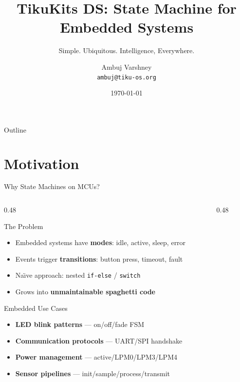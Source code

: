 \documentclass[aspectratio=169, 10pt]{beamer}
\title[TikuKits DS]{TikuKits DS: State Machine for Embedded Systems}
\subtitle{Simple. Ubiquitous. Intelligence, Everywhere.}
\author[Ambuj Varshney]{Ambuj Varshney \\ \texttt{ambuj@tiku-os.org}}
\date{\today}
\begin{document}
\begin{frame}
\titlepage
\end{frame}

\begin{frame}{Outline}
\tableofcontents
\end{frame}

\section{Motivation}

\begin{frame}{Why State Machines on MCUs?}
\begin{columns}[T]
\begin{column}{0.48\textwidth}
\begin{block}{The Problem}
\begin{itemize}
  \item Embedded systems have \textbf{modes}: idle, active, sleep, error
  \item Events trigger \textbf{transitions}: button press, timeout, fault
  \item Na\"{\i}ve approach: nested \texttt{if-else} / \texttt{switch}
  \item Grows into \textbf{unmaintainable spaghetti code}
\end{itemize}
\end{block}

\begin{block}{Embedded Use Cases}
\begin{itemize}
  \item \textbf{LED blink patterns} --- on/off/fade FSM
  \item \textbf{Communication protocols} --- UART/SPI handshake
  \item \textbf{Power management} --- active/LPM0/LPM3/LPM4
  \item \textbf{Sensor pipelines} --- init/sample/process/transmit
\end{itemize}
\end{block}
\end{column}

\begin{column}{0.48\textwidth}
\begin{center}
\end{center}
\end{column}
\end{columns}
\end{frame}
\end{document}
